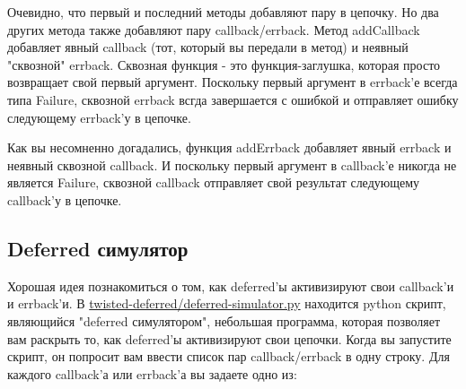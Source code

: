 Очевидно, что первый и последний методы добавляют 
пару в цепочку. Но два других метода также добавляют 
пару callback/errback. Метод addCallback добавляет явный 
callback (тот, который вы передали в метод) и неявный 
"сквозной" errback. Сквозная функция - это функция-заглушка, 
которая просто возвращает свой первый аргумент. Поскольку 
первый аргумент в errback'е всегда типа Failure, сквозной 
errback всгда завершается с ошибкой и отправляет ошибку 
следующему errback'у в цепочке.


Как вы несомненно догадались, функция addErrback добавляет 
явный errback и неявный сквозной callback. И поскольку первый 
аргумент в callback'е никогда не является Failure, 
сквозной callback отправляет свой результат следующему 
callback'у в цепочке.


\subsection{Deferred симулятор}

Хорошая идея познакомиться о том, как deferred'ы 
активизируют свои callback'и и errback'и. В 
\href{http://github.com/jdavisp3/twisted-intro/blob/master/twisted-deferred/deferred-simulator.py#L1}{twisted-deferred/deferred-simulator.py} 
находится python скрипт, являющийся "deferred симулятором", 
небольшая программа, которая позволяет вам 
раскрыть то, как deferred'ы активизируют свои цепочки. 
Когда вы запустите скрипт, он попросит вам ввести список пар 
callback/errback в одну строку. Для каждого callback'а или 
errback'а вы задаете одно из:

